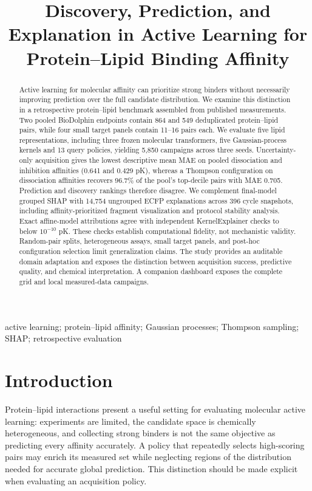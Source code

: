 \documentclass[wcp]{jmlr}
\title[Active Learning for Protein--Lipid Affinity]{Discovery, Prediction, and Explanation in Active Learning for Protein--Lipid Binding Affinity}
\author{}
\begin{document}
\makeatletter\let\@jmlrpages\@empty\makeatother
\maketitle
\begin{abstract}
Active learning for molecular affinity can prioritize strong binders without
necessarily improving prediction over the full candidate distribution. We
examine this distinction in a retrospective protein--lipid benchmark assembled
from published measurements. Two pooled BioDolphin endpoints contain 864 and
549 deduplicated protein--lipid pairs, while four small target panels contain
11--16 pairs each. We evaluate five lipid representations, including three
frozen molecular transformers, five Gaussian-process kernels and 13 query
policies, yielding 5,850 campaigns across three seeds. Uncertainty-only
acquisition gives the lowest descriptive mean MAE on pooled dissociation
and inhibition affinities (0.641 and 0.429 pK), whereas a Thompson
configuration on dissociation affinities recovers 96.7\% of the pool's
top-decile pairs with MAE 0.705. Prediction and discovery rankings therefore
disagree. We complement final-model grouped SHAP with 14,754 ungrouped ECFP
explanations across 396 cycle snapshots, including affinity-prioritized
fragment visualization and protocol stability analysis. Exact affine-model
attributions agree with independent KernelExplainer checks to below
$10^{-10}$ pK. These checks establish computational fidelity, not mechanistic
validity. Random-pair splits, heterogeneous assays, small target panels, and
post-hoc configuration selection limit generalization claims. The study
provides an auditable domain adaptation and exposes the distinction between
acquisition success, predictive quality, and chemical interpretation. A
companion dashboard exposes the complete grid and local measured-data campaigns.
\end{abstract}
\begin{keywords}
active learning; protein--lipid affinity; Gaussian processes; Thompson sampling; SHAP; retrospective evaluation
\end{keywords}

\section{Introduction}
Protein--lipid interactions present a useful setting for evaluating molecular
active learning: experiments are limited, the candidate space is chemically
heterogeneous, and collecting strong binders is not the same objective as
predicting every affinity accurately. A policy that repeatedly selects
high-scoring pairs may enrich its measured set while neglecting regions of
the distribution needed for accurate global prediction. This distinction
should be made explicit when evaluating an acquisition policy.
\end{document}
